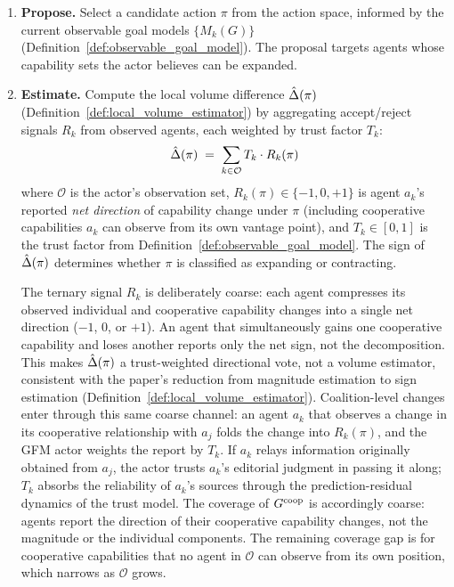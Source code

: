 \begin{enumerate}
\item \textbf{Propose.} Select a candidate action $\pi$ from the action space, informed by the current observable goal models $\{M_k(G)\}$ (Definition~\ref{def:observable_goal_model}). The proposal targets agents whose capability sets the actor believes can be expanded.

\item \textbf{Estimate.} Compute the local volume difference $\hat{\Delta}(\pi)$ (Definition~\ref{def:local_volume_estimator}) by aggregating accept/reject signals $R_k$ from observed agents, each weighted by trust factor $T_k$:
\begin{equation}
\label{eq:aggregate_signal}
\hat{\Delta}(\pi) \;=\; \sum_{k \in \mathcal{O}} T_k \cdot R_k(\pi)
\end{equation}
where $\mathcal{O}$ is the actor's observation set, $R_k(\pi) \in \{-1, 0, +1\}$ is agent $a_k$'s reported \emph{net direction} of capability change under $\pi$ (including cooperative capabilities $a_k$ can observe from its own vantage point), and $T_k \in [0, 1]$ is the trust factor from Definition~\ref{def:observable_goal_model}. The sign of $\hat{\Delta}(\pi)$ determines whether $\pi$ is classified as expanding or contracting.

The ternary signal $R_k$ is deliberately coarse: each agent compresses its
observed individual and cooperative capability changes into a single net
direction ($-1$, $0$, or $+1$). An agent that simultaneously gains one
cooperative capability and loses another reports only the net sign, not the
decomposition. This makes $\hat{\Delta}(\pi)$ a trust-weighted directional vote,
not a volume estimator, consistent with the paper's reduction from magnitude
estimation to sign estimation (Definition~\ref{def:local_volume_estimator}).
Coalition-level changes enter through this same coarse channel: an agent $a_k$
that observes a change in its cooperative relationship with $a_j$ folds the
change into $R_k(\pi)$, and the GFM actor weights the report by $T_k$. If
$a_k$ relays information originally obtained from $a_j$, the actor trusts
$a_k$'s editorial judgment in passing it along; $T_k$ absorbs the reliability
of $a_k$'s sources through the prediction-residual dynamics of the trust
model. The coverage of $G^{\mathrm{coop}}$ is accordingly coarse: agents report the
direction of their cooperative capability changes, not the magnitude or the
individual components. The remaining coverage gap is for cooperative
capabilities that no agent in $\mathcal{O}$ can observe from its own position,
which narrows as $\mathcal{O}$ grows.


\end{enumerate}
